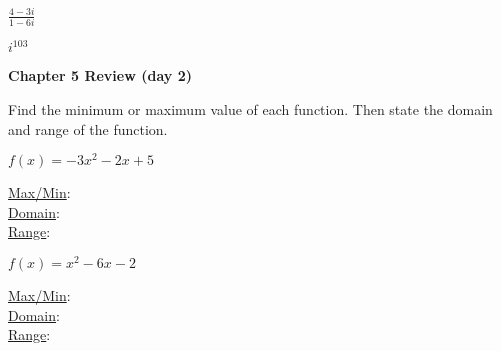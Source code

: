\documentclass{report}
\theoremstyle{definition}
\begin{document}
\begin{enumerate}
\setcounter{enumi}{18}
	\begin{minipage}[t]{0.45\linewidth}
		\item $\displaystyle\frac{4-3i}{1-6i}$
		\vspace{1cm}
	\end{minipage}
	\hfill
	\begin{minipage}[t]{0.45\linewidth}
		\item $i^{103}$
		\vspace{1cm}
	\end{minipage}

\end{enumerate}



 \newpage


\noindent\Large\textbf{Chapter 5 Review (day 2)}\normalsize




\noindent Find the minimum or maximum value of each function. Then state the domain and range of the function.

\begin{enumerate}
\setcounter{enumi}{20}


\begin{minipage}[t]{0.45\linewidth}
\item $f(x)=-3x^2-2x+5$\\

\vspace{1cm}

\underline{Max/Min}:\\

\underline{Domain}:\\

\underline{Range}:\\
\end{minipage}
\hfill
\begin{minipage}[t]{0.45\linewidth}
\item $f(x)=x^2-6x-2$\\

\vspace{1cm}

\underline{Max/Min}:\\

\underline{Domain}:\\

\underline{Range}:\\
\end{minipage}

\end{enumerate}
\end{document}
